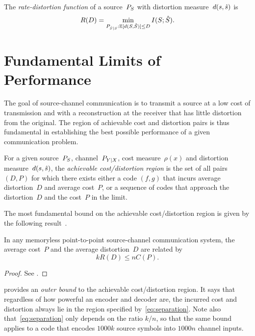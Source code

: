 \begin{definition}
  \label{def:ratedistortion}
  The \emph{rate-distortion function} of a source~${P_S}$ with distortion
  measure~$d(s,{\hat{s}})$ is 
  \begin{equation*}
    R(D) = \min_{P_{{\hat{S}}|S}: \mathbb{E}[d(S,{\hat{S}})] \le D} I(S;{\hat{S}}).
  \end{equation*}
\end{definition}


\section{Fundamental Limits of Performance}\label{sec:fundamentallimits}

The goal of source-channel communication is to transmit a source at a low cost
of transmission and with a reconstruction at the receiver that has little
distortion from the original. The region of achievable cost and distortion pairs
is thus fundamental in establishing the best possible performance of a given
communication problem.

\begin{definition}
  \label{def:achievableregion}
  For a given source~${P_S}$, channel~$P_{Y|X}$, cost measure~$\rho(x)$ and
  distortion measure~$d(s,{\hat{s}})$, the \emph{achievable cost\slash distortion
  region} is the set of all pairs $(D,P)$ for which there exists either a code
  $(f,g)$ that incurs average distortion~$D$ and average cost~$P$, or a sequence
  of codes that approach the distortion~$D$ and the cost~$P$ in the limit.
\end{definition}

The most fundamental bound on the achievable cost/distortion region is given by
the following result~\cite[Theorem~21]{Shannon1948}.

\begin{theorem}
  \label{thm:separationconverse}
  In any memoryless point-to-point source-channel communication system, the
  average cost~$P$ and the average distortion~$D$ are related by
  \begin{equation}
    \label{eq:separation}
    kR(D) \le nC(P).
  \end{equation}
\end{theorem}

\begin{proof}
  See .
\end{proof}

 provides an \emph{outer bound} to the achievable
cost/distortion region. It says that regardless of how powerful an encoder and
decoder are, the incurred cost and distortion always lie in the region
specified by~\eqref{eq:separation}. Note also that~\eqref{eq:separation} only
depends on the ratio $k/n$, so that the same bound applies to a code that
encodes $1000k$ source symbols into $1000n$ channel inputs. 

